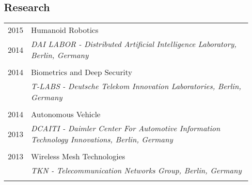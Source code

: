 \subsection{Research}
\begin{longtable}
	{r|p{13cm}}

	\textsc{2015} & Humanoid Robotics\\
	\textsc{2014}&\emph{DAI LABOR - Distributed Artificial Intelligence Laboratory, Berlin, Germany}\\
	\multicolumn{2}{c}{} \\

	\textsc{2014} & Biometrics and Deep Security\\
	\textsc{}&\emph{T-LABS - Deutsche Telekom Innovation Laboratories, Berlin, Germany}\\
	\multicolumn{2}{c}{} \\

	\textsc{2014} & Autonomous Vehicle\\
	\textsc{2013}&\emph{DCAITI - Daimler Center For Automotive Information Technology Innovations, Berlin, Germany}\\
	\multicolumn{2}{c}{} \\

	\textsc{2013} & Wireless Mesh Technologies\\
	\textsc{}&\emph{TKN - Telecommunication Networks Group, Berlin, Germany}\\
	\multicolumn{2}{c}{} \\

\end{longtable}
